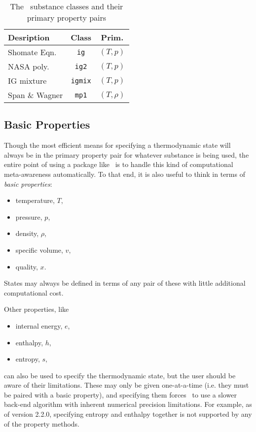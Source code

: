 \begin{table}
\centering
\caption{The \PM\ substance classes and their primary property pairs}\label{tab:primary}
\begin{tabular}{|lcc|}
\hline
Desription & Class & Prim.\\
\hline
Shomate Eqn. & \verb|ig| & $(T,p)$\\
NASA poly. & \verb|ig2| & $(T,p)$\\
IG mixture & \verb|igmix| & $(T,p)$\\
Span \& Wagner & \verb|mp1| & $(T,\rho)$\\
\hline
\end{tabular}
\end{table}

\subsection{Basic Properties}\label{sec:intro:basic}

Though the most efficient means for specifying a thermodynamic state will always be in the primary property pair for whatever substance is being used, the entire point of using a package like \PM\ is to handle this kind of computational meta-awareness automatically.  To that end, it is also useful to think in terms of \emph{basic properties}:
\begin{itemize}
\item temperature, $T$,
\item pressure, $p$,
\item density, $\rho$,
\item specific volume, $v$,
\item quality, $x$.
\end{itemize}
States may always be defined in terms of any pair of these with little additional computational cost.

Other properties, like 
\begin{itemize}
\item internal energy, $e$,
\item enthalpy, $h$, 
\item entropy, $s$,
\end{itemize}
can also be used to specify the thermodynamic state, but the user should be aware of their limitations.  These may only be given one-at-a-time (i.e. they must be paired with a basic property), and specifying them forces \PM\ to use a slower back-end algorithm with inherent numerical precision limitations.  For example, as of version 2.2.0, specifying entropy and enthalpy together is not supported by any of the property methods.  


